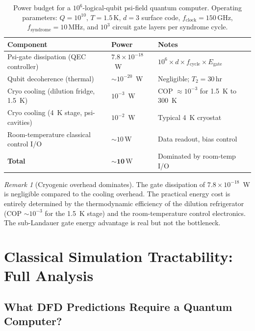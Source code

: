 \documentclass[11pt]{article}
\theoremstyle{definition}
\theoremstyle{remark}
\newtheorem{remark}[theorem]{Remark}
\begin{document}
\begin{table}[h]
\centering
\caption{Power budget for a $10^6$-logical-qubit psi-field quantum computer.
Operating parameters: $Q = 10^{10}$, $T = 1.5\,\mathrm{K}$,
$d=3$ surface code, $f_{\mathrm{clock}} = 150\,\mathrm{GHz}$,
$f_{\mathrm{syndrome}} = 10\,\mathrm{MHz}$, and $10^3$
circuit gate layers per syndrome cycle.}
\label{tab:power_budget}
\begin{tabular}{@{}lll@{}}
\toprule
Component & Power & Notes \\
\midrule
Psi-gate dissipation (QEC controller) & $7.8\times10^{-18}$~W
  & $10^6\times d\times f_{\mathrm{cycle}}\times E_{\mathrm{gate}}$ \\
Qubit decoherence (thermal) & $\sim 10^{-20}$~W
  & Negligible; $T_2 = 30\,\mathrm{hr}$ \\
Cryo cooling (dilution fridge, 1.5~K) & $10^{-3}$~W
  & COP $\approx 10^{-3}$ for 1.5~K to 300~K \\
Cryo cooling (4~K stage, psi-cavities) & $10^{-2}$~W
  & Typical 4~K cryostat \\
Room-temperature classical control I/O & $\sim 10\,\mathrm{W}$
  & Data readout, bias control \\
\midrule
\textbf{Total} & $\mathbf{\sim 10\,\mathrm{W}}$
  & Dominated by room-temp I/O \\
\bottomrule
\end{tabular}
\end{table}

\begin{remark}[Cryogenic overhead dominates]
The gate dissipation of $7.8\times10^{-18}$~W is negligible compared to
the cooling overhead. The practical energy cost is entirely determined by
the thermodynamic efficiency of the dilution refrigerator (COP $\sim10^{-3}$
for the 1.5~K stage) and the room-temperature control electronics. The
sub-Landauer gate energy advantage is real but not the bottleneck.
\end{remark}

\section{Classical Simulation Tractability: Full Analysis}
\label{sec:classical_sim}

\subsection{What DFD Predictions Require a Quantum Computer?}
\end{document}
